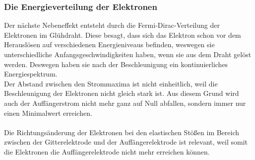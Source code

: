 \subsubsection{Die Energieverteilung der Elektronen}
\label{subsubsec:Energieverteilung}
Der nächste Nebeneffekt entsteht durch die Fermi-Dirac-Verteilung der Elektronen im Glühdraht. Diese besagt, dass sich das Elektron schon vor dem
Herauslösen auf verschiedenen Energieniveaus befinden, weswegen sie unterschiedliche Anfangsgeschwindigkeiten haben, wenn sie aus dem Draht gelöst werden.
Deswegen haben sie nach der Beschleunigung ein kontinuierliches Energiespektrum.\\
Der Abstand zwischen den Strommaxima ist nicht einheitlich, weil die Beschleunigung der Elektronen nicht gleich stark ist. Aus diesem Grund wird auch der Auffängerstrom nicht mehr
ganz auf Null abfallen, sondern immer nur einen Minimalwert erreichen.\\
\\
Die Richtungsänderung der Elektronen bei den elastischen Stößen im Bereich zwischen der Gitterelektrode und der Auffängerelektrode ist relevant,
weil somit die Elektronen die Auffängerelektrode nicht mehr erreichen können.

